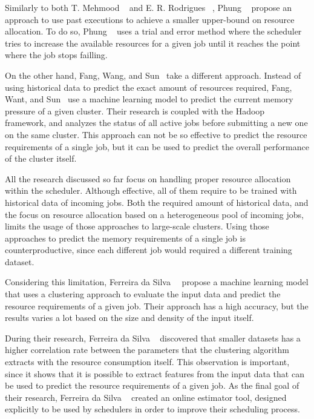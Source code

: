 Similarly to both T. Mehmood \etal~\cite{mehmood2018} and E. R. Rodrigues \etal~\cite{rodrigues2016}, Phung \etal~\cite{phung2021} propose an approach to use past executions to achieve a smaller upper-bound on resource allocation.
To do so, Phung \etal~\cite{phung2021} uses a trial and error method where the scheduler tries to increase the available resources for a given job until it reaches the point where the job stops failling.

On the other hand, Fang, Wang, and Sun~\cite{fang2018} take a different approach.
Instead of using historical data to predict the exact amount of resources required, Fang, Want, and Sun~\cite{fang2018} use a machine learning model to predict the current memory pressure of a given cluster.
Their research is coupled with the Hadoop~\cite{hadoop} framework, and analyzes the status of all active jobs before submitting a new one on the same cluster.
This approach can not be so effective to predict the resource requirements of a single job, but it can be used to predict the overall performance of the cluster itself.

All the research discussed so far focus on handling proper resource allocation within the scheduler.
Although effective, all of them require to be trained with historical data of incoming jobs.
Both the required amount of historical data, and the focus on resource allocation based on a heterogeneous pool of incoming jobs, limits the usage of those approaches to large-scale clusters.
Using those approaches to predict the memory requirements of a single job is counterproductive, since each different job would required a different training dataset.

Considering this limitation, Ferreira da Silva~\etal~\cite{ferreira2013} propose a machine learning model that uses a clustering approach to evaluate the input data and predict the resource requirements of a given job.
Their approach has a high accuracy, but the results varies a lot based on the size and density of the input itself.

During their research, Ferreira da Silva \etal~\cite{ferreira2013} discovered that smaller datasets has a higher correlation rate between the parameters that the clustering algorithm extracts with the resource consumption itself.
This observation is important, since it shows that it is possible to extract features from the input data that can be used to predict the resource requirements of a given job.
As the final goal of their research, Ferreira da Silva \etal~\cite{ferreira2013} created an online estimator tool, designed explicitly to be used by schedulers in order to improve their scheduling process.

